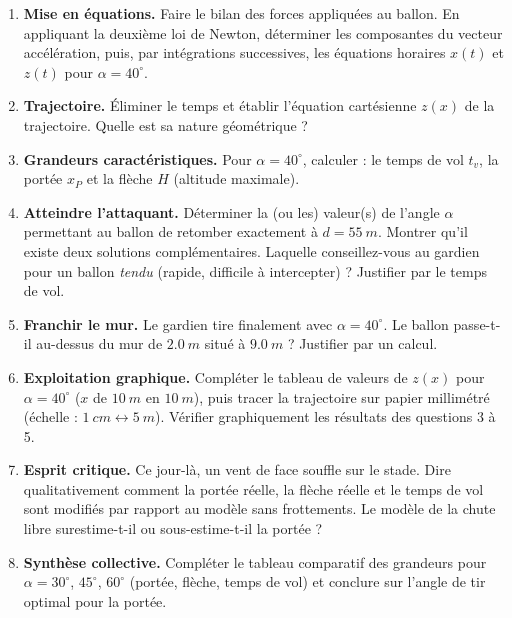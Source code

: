 \documentclass[11pt]{article}
\newcounter{popsec}
\newcounter{popsub}
\newcommand{\courssub}[1]{%
  \stepcounter{popsub}%
  \par\vspace{9pt}\noindent{\popxbold\fontsize{11.5}{13}\selectfont\color{popink}{\color{poporange}\thepopsec.\thepopsub}\hspace{6pt}#1}\par\nopagebreak\vspace{4pt}
}
\begin{document}
\begin{enumerate}
\item \textbf{Mise en équations.} Faire le bilan des forces appliquées au ballon. En appliquant la deuxième loi de Newton, déterminer les composantes du vecteur accélération, puis, par intégrations successives, les équations horaires $x(t)$ et $z(t)$ pour $\alpha = 40^{\circ}$.
\item \textbf{Trajectoire.} Éliminer le temps et établir l'équation cartésienne $z(x)$ de la trajectoire. Quelle est sa nature géométrique ?
\item \textbf{Grandeurs caractéristiques.} Pour $\alpha = 40^{\circ}$, calculer : le temps de vol $t_v$, la portée $x_P$ et la flèche $H$ (altitude maximale).
\item \textbf{Atteindre l'attaquant.} Déterminer la (ou les) valeur(s) de l'angle $\alpha$ permettant au ballon de retomber exactement à $d = \SI{55}{m}$. Montrer qu'il existe deux solutions complémentaires. Laquelle conseillez-vous au gardien pour un ballon \emph{tendu} (rapide, difficile à intercepter) ? Justifier par le temps de vol.
\item \textbf{Franchir le mur.} Le gardien tire finalement avec $\alpha = 40^{\circ}$. Le ballon passe-t-il au-dessus du mur de $\SI{2,0}{m}$ situé à $\SI{9,0}{m}$ ? Justifier par un calcul.
\item \textbf{Exploitation graphique.} Compléter le tableau de valeurs de $z(x)$ pour $\alpha = 40^{\circ}$ ($x$ de $\SI{10}{m}$ en $\SI{10}{m}$), puis tracer la trajectoire sur papier millimétré (échelle : $\SI{1}{cm} \leftrightarrow \SI{5}{m}$). Vérifier graphiquement les résultats des questions 3 à 5.
\item \textbf{Esprit critique.} Ce jour-là, un vent de face souffle sur le stade. Dire qualitativement comment la portée réelle, la flèche réelle et le temps de vol sont modifiés par rapport au modèle sans frottements. Le modèle de la chute libre surestime-t-il ou sous-estime-t-il la portée ?
\item \textbf{Synthèse collective.} Compléter le tableau comparatif des grandeurs pour $\alpha = 30^{\circ}$, $45^{\circ}$, $60^{\circ}$ (portée, flèche, temps de vol) et conclure sur l'angle de tir optimal pour la portée.
\end{enumerate}

\courssub{Ressources à mobiliser}
\end{document}
